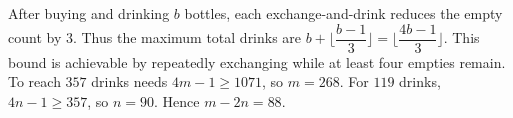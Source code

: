 After buying and drinking $b$ bottles, each exchange-and-drink reduces the empty count by $3$. Thus the maximum total drinks are $b+\lfloor\dfrac{b-1}{3}\rfloor=\lfloor\dfrac{4b-1}{3}\rfloor$. This bound is achievable by repeatedly exchanging while at least four empties remain. To reach $357$ drinks needs $4m-1\ge1071$, so $m=268$. For $119$ drinks, $4n-1\ge357$, so $n=90$. Hence $\boxed{m-2n=88}$.
